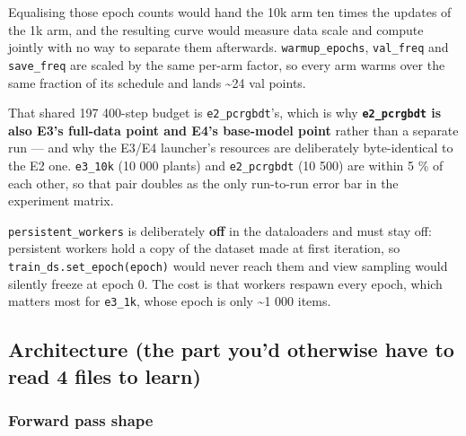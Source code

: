 \documentclass[
  10pt,
]{article}
\begin{document}
Equalising those epoch counts would hand the 10k arm ten times the
updates of the 1k arm, and the resulting curve would measure data scale
and compute jointly with no way to separate them afterwards.
\texttt{warmup\_epochs}, \texttt{val\_freq} and \texttt{save\_freq} are
scaled by the same per-arm factor, so every arm warms over the same
fraction of its schedule and lands \textasciitilde24 val points.

That shared 197 400-step budget is \texttt{e2\_pcrgbdt}'s, which is why
\textbf{\texttt{e2\_pcrgbdt} is also E3's full-data point and E4's
base-model point} rather than a separate run --- and why the E3/E4
launcher's resources are deliberately byte-identical to the E2 one.
\texttt{e3\_10k} (10 000 plants) and \texttt{e2\_pcrgbdt} (10 500) are
within 5 \% of each other, so that pair doubles as the only run-to-run
error bar in the experiment matrix.

\texttt{persistent\_workers} is deliberately \textbf{off} in the
dataloaders and must stay off: persistent workers hold a copy of the
dataset made at first iteration, so \texttt{train\_ds.set\_epoch(epoch)}
would never reach them and view sampling would silently freeze at epoch
0. The cost is that workers respawn every epoch, which matters most for
\texttt{e3\_1k}, whose epoch is only \textasciitilde1 000 items.

\subsection{Architecture (the part you'd otherwise have to read 4 files
to
learn)}\label{architecture-the-part-youd-otherwise-have-to-read-4-files-to-learn}

\subsubsection{Forward pass shape}\label{forward-pass-shape}
\end{document}
